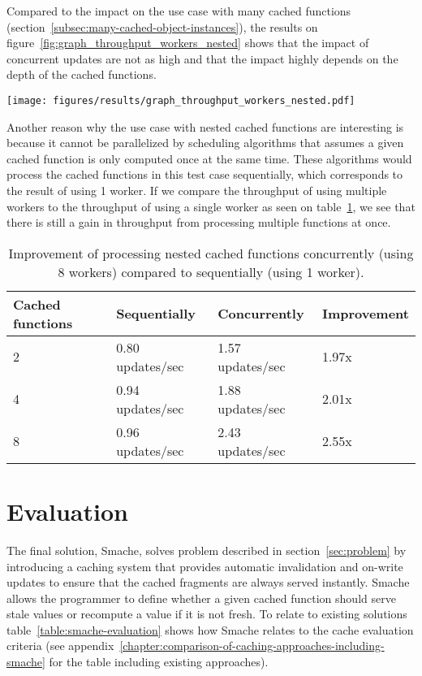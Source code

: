 Compared to the impact on the use case with many cached functions (section~\ref{subsec:many-cached-object-instances}), the results on figure~\ref{fig:graph_throughput_workers_nested} shows that the impact of concurrent updates are not as high and that the impact highly depends on the depth of the cached functions.

\begin{figure*}[ht!]
  \centering
  \texttt{[image: figures/results/graph\_throughput\_workers\_nested.pdf]}
  \caption{How the system scales with nested cached functions while the number of workers is increased}
  \label{fig:graph_throughput_workers_nested}
\end{figure*}

Another reason why the use case with nested cached functions are interesting is because it cannot be parallelized by scheduling algorithms that assumes a given cached function is only computed once at the same time. These algorithms would process the cached functions in this test case sequentially, which corresponds to the result of using 1 worker. If we compare the throughput of using multiple workers to the throughput of using a single worker as seen on table~\ref{tab:nested-relative-results}, we see that there is still a gain in throughput from processing multiple functions at once.

\begin{table}[ht!]
  \centering
  \begin{tabular}{llll}
    \hline
    Cached functions & Sequentially & Concurrently & Improvement \\
    \hline
    2 & 0.80 updates/sec & 1.57 updates/sec & 1.97x \\
    4 & 0.94 updates/sec & 1.88 updates/sec & 2.01x \\
    8 & 0.96 updates/sec & 2.43 updates/sec & 2.55x \\
    \hline
  \end{tabular}
  \caption{Improvement of processing nested cached functions concurrently (using 8 workers) compared to sequentially (using 1 worker).}
  \label{tab:nested-relative-results}
\end{table}

\section{Evaluation}
\label{sec:evaluation}

The final solution, Smache, solves problem described in section~\ref{sec:problem} by introducing a caching system that provides automatic invalidation and on-write updates to ensure that the cached fragments are always served instantly. Smache allows the programmer to define whether a given cached function should serve stale values or recompute a value if it is not fresh. To relate to existing solutions table~\ref{table:smache-evaluation} shows how Smache relates to the cache evaluation criteria (see appendix~\ref{chapter:comparison-of-caching-approaches-including-smache} for the table including existing approaches).

